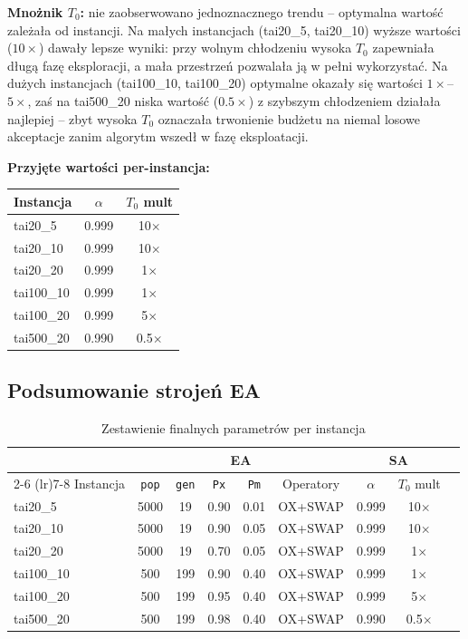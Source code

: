 \documentclass[11pt,a4paper]{article}
\begin{document}
\textbf{Mnożnik $T_0$:} nie zaobserwowano jednoznacznego trendu -- optymalna wartość zależała od instancji. Na małych instancjach (tai20\_5, tai20\_10) wyższe wartości ($10\times$) dawały lepsze wyniki: przy wolnym chłodzeniu wysoka $T_0$ zapewniała długą fazę eksploracji, a mała przestrzeń pozwalała ją w pełni wykorzystać. Na dużych instancjach (tai100\_10, tai100\_20) optymalne okazały się wartości $1\times$--$5\times$, zaś na tai500\_20 niska wartość ($0.5\times$) z szybszym chłodzeniem działała najlepiej -- zbyt wysoka $T_0$ oznaczała trwonienie budżetu na niemal losowe akceptacje zanim algorytm wszedł w fazę eksploatacji.

\textbf{Przyjęte wartości per-instancja:}
\begin{table}[H]
\centering
\begin{tabular}{lcc}
\toprule
Instancja & $\alpha$ & $T_0$ mult \\
\midrule
tai20\_5   & 0.999 & 10$\times$ \\
tai20\_10  & 0.999 & 10$\times$ \\
tai20\_20  & 0.999 & 1$\times$  \\
tai100\_10 & 0.999 & 1$\times$  \\
tai100\_20 & 0.999 & 5$\times$  \\
tai500\_20 & 0.990 & 0.5$\times$ \\
\bottomrule
\end{tabular}
\end{table}

\subsection{Podsumowanie strojeń EA}

\begin{table}[H]
\centering
\caption{Zestawienie finalnych parametrów per instancja}
\begin{tabular}{lcccccccc}
\toprule
 & \multicolumn{5}{c}{EA} & \multicolumn{2}{c}{SA} \\
\cmidrule(lr){2-6} \cmidrule(lr){7-8}
Instancja & \texttt{pop} & \texttt{gen} & \texttt{Px} & \texttt{Pm} & Operatory & $\alpha$ & $T_0$ mult \\
\midrule
tai20\_5   & 5000 & 19  & 0.90 & 0.01 & OX+SWAP & 0.999 & 10$\times$ \\
tai20\_10  & 5000 & 19  & 0.90 & 0.05 & OX+SWAP & 0.999 & 10$\times$ \\
tai20\_20  & 5000 & 19  & 0.70 & 0.05 & OX+SWAP & 0.999 & 1$\times$  \\
tai100\_10 & 500  & 199 & 0.90 & 0.40 & OX+SWAP & 0.999 & 1$\times$  \\
tai100\_20 & 500  & 199 & 0.95 & 0.40 & OX+SWAP & 0.999 & 5$\times$  \\
tai500\_20 & 500  & 199 & 0.98 & 0.40 & OX+SWAP & 0.990 & 0.5$\times$ \\
\bottomrule
\end{tabular}
\end{table}
\end{document}
